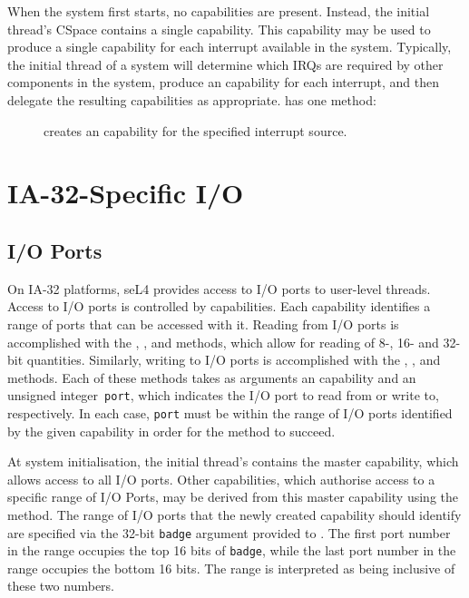 When the system first starts, no  capabilities are
present. Instead, the initial thread's CSpace contains a single
 capability. This capability may be used to produce
a single  capability for each interrupt available in the
system. Typically, the initial thread of a system will determine which
IRQs are required by other components in the system, produce an
 capability for each interrupt, and then delegate the
resulting capabilities as appropriate.  has one method:

\begin{description}
    \item[] creates an
     capability for the specified interrupt source.
\end{description}

\ifxeightsix
\section{IA-32-Specific I/O}

\subsection{I/O Ports}
\label{sec:ioports}

On IA-32 platforms, seL4 provides access to I/O ports to user-level threads.
Access to I/O ports is controlled by  capabilities. Each
 capability identifies a range of ports that can be accessed with
it. Reading from I/O ports is accomplished with the
,
, and
 methods, which
allow for reading of 8-, 16- and 32-bit quantities.
Similarly, writing to I/O ports is accomplished with the
,
, and
 methods.
Each of these methods takes as arguments an  capability
and an unsigned integer~\texttt{port}, which indicates the I/O port to read from
or write to, respectively.
In each case, \texttt{port} must be within the range of I/O ports identified
by the given  capability in order for the method to succeed.

At system initialisation, the initial thread's  contains the
master  capability, which allows access to all I/O ports.
Other  capabilities, which authorise access to a specific
range of I/O Ports, may be derived from this master capability using
the  method. 
The range of I/O ports that the newly created capability should identify
are specified via the 32-bit \texttt{badge} argument provided to 
. The first port number in the range
occupies the top 16 bits of \texttt{badge}, while the last port number in
the range occupies the bottom 16 bits. The range is interpreted as being
inclusive of these two numbers.

